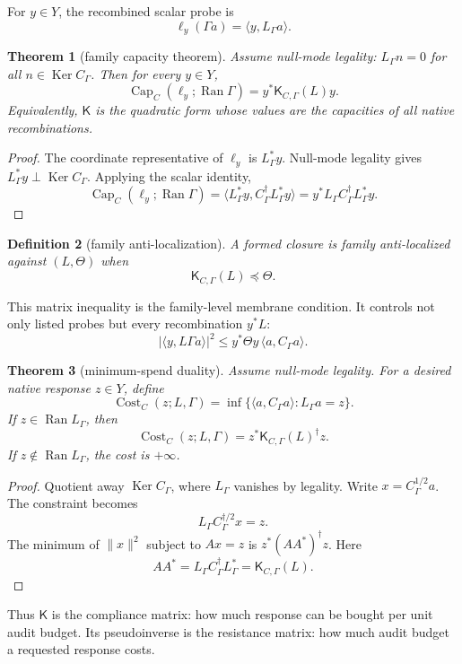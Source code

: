 \documentclass[11pt]{article}
\newtheorem{theorem}{Theorem}[section]
\newtheorem{definition}[theorem]{Definition}
\newcommand{\Capa}{\operatorname{Cap}}
\newcommand{\Ran}{\operatorname{Ran}}
\newcommand{\Ker}{\operatorname{Ker}}
\newcommand{\Cost}{\operatorname{Cost}}
\newcommand{\Kmat}{\mathsf K}
\begin{document}
For $y\in Y$, the recombined scalar probe is
\[
\ell_y(\Gamma a)=\langle y,L_\Gamma a\rangle.
\]

\begin{theorem}[family capacity theorem]
Assume null-mode legality: $L_\Gamma n=0$ for all $n\in\Ker C_\Gamma$.  Then for every $y\in Y$,
\[
\boxed{\Capa_C(\ell_y;\Ran\Gamma)=y^*\Kmat_{C,\Gamma}(L)y.}
\]
Equivalently, $\Kmat$ is the quadratic form whose values are the capacities of all native recombinations.
\end{theorem}

\begin{proof}
The coordinate representative of $\ell_y$ is $L_\Gamma^*y$.  Null-mode legality gives $L_\Gamma^*y\perp\Ker C_\Gamma$.  Applying the scalar identity,
\[
\Capa_C(\ell_y;\Ran\Gamma)
=\langle L_\Gamma^*y,C_\Gamma^\dagger L_\Gamma^*y\rangle
=y^*L_\Gamma C_\Gamma^\dagger L_\Gamma^*y.
\]
\end{proof}

\begin{definition}[family anti-localization]
A formed closure is family anti-localized against $(L,\Theta)$ when
\[
\boxed{\Kmat_{C,\Gamma}(L)\preceq\Theta.}
\]
\end{definition}

This matrix inequality is the family-level membrane condition.  It controls not only listed probes but every recombination $y^*L$:
\[
|\langle y,L\Gamma a\rangle|^2
\le y^*\Theta y\,\langle a,C_\Gamma a\rangle.
\]

\begin{theorem}[minimum-spend duality]
Assume null-mode legality.  For a desired native response $z\in Y$, define
\[
\Cost_C(z;L,\Gamma)=\inf\{\langle a,C_\Gamma a\rangle:L_\Gamma a=z\}.
\]
If $z\in\Ran L_\Gamma$, then
\[
\boxed{\Cost_C(z;L,\Gamma)=z^*\Kmat_{C,\Gamma}(L)^\dagger z.}
\]
If $z\notin\Ran L_\Gamma$, the cost is $+\infty$.
\end{theorem}

\begin{proof}
Quotient away $\Ker C_\Gamma$, where $L_\Gamma$ vanishes by legality.  Write $x=C_\Gamma^{1/2}a$.  The constraint becomes
\[
L_\Gamma C_\Gamma^{\dagger/2}x=z.
\]
The minimum of $\|x\|^2$ subject to $Ax=z$ is $z^*(AA^*)^\dagger z$.  Here
\[
AA^*=L_\Gamma C_\Gamma^\dagger L_\Gamma^*=\Kmat_{C,\Gamma}(L).
\]
\end{proof}

Thus $\Kmat$ is the compliance matrix: how much response can be bought per unit audit budget.  Its pseudoinverse is the resistance matrix: how much audit budget a requested response costs.
\end{document}

